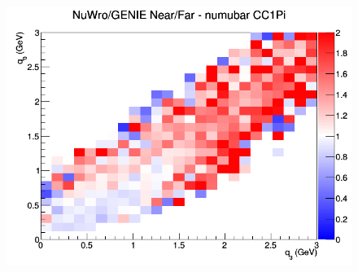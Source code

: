 \begin{figure}[h]
\endminipage
{}
\includegraphics[width=\linewidth]{eff_q0_q3/GAr/ratios/CC1Pi_NuWro_GENIE_numubar_NF_q3_q0.png}
\endminipage
\newline
\end{figure}
\clearpage
